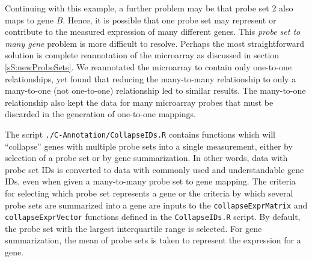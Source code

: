 Continuing with this example, a further problem may be 
that probe set 2 also maps to gene $B$.
Hence, it is possible that one probe set may represent or 
contribute to the measured expression of many different genes. This
\emph{probe set to many gene} problem is more difficult to resolve.
Perhaps the most straightforward solution is complete reannotation of
the microarray as discussed in section \ref{sS:newProbeSets}. We
reannotated the microarray to contain only one-to-one relationships, yet found that 
reducing the many-to-many relationship to only a many-to-one (not one-to-one) relationship 
led to similar results. The many-to-one relationship also kept the data
for many microarray probes that must be discarded
in the generation of one-to-one mappings.

The script \texttt{./C-Annotation/CollapseIDs.R} contains functions which
will ``collapse'' genes with multiple probe sets into a single
measurement, either by selection of a probe set or by gene summarization. In other
words, data with probe set IDs is converted to data with commonly used and
understandable gene IDs, even when given a many-to-many probe set to gene 
mapping. The criteria for selecting which probe set represents a gene or 
the criteria by which several probe sets are summarized into a gene are 
inputs to the \texttt{collapseExprMatrix} and \texttt{collapseExprVector}
functions defined in the \texttt{CollapseIDs.R} script. By default, the probe set
with the largest interquartile range is selected. For gene summarization,
the mean of probe sets is taken to represent the expression for a gene.

